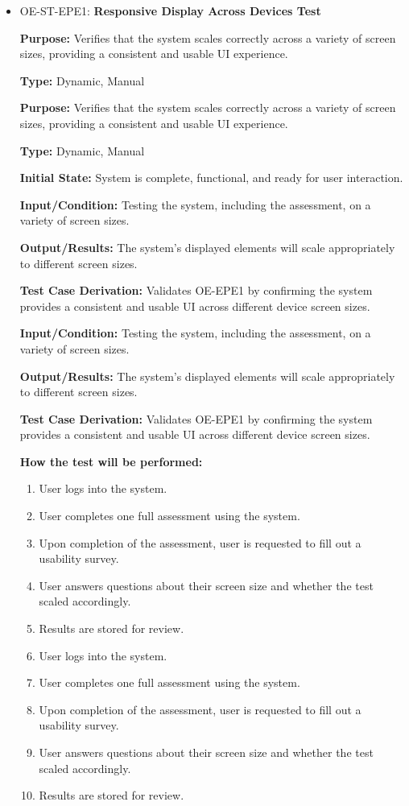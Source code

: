 \documentclass[12pt, titlepage]{article}
\begin{document}
\begin{itemize}
  \item OE-ST-EPE1: \textbf{Responsive Display Across Devices Test}
  \begin{mdframed}[linewidth=0.5mm]
      \textbf{Purpose:} Verifies that the system scales correctly across a variety of screen sizes, providing a consistent and usable UI experience. \par
      \textbf{Type:} Dynamic, Manual \par
      \textbf{Purpose:} Verifies that the system scales correctly across a variety of screen sizes, providing a consistent and usable UI experience. \par
      \textbf{Type:} Dynamic, Manual \par
      \textbf{Initial State:} System is complete, functional, and ready for user interaction. \par
      \textbf{Input/Condition:} Testing the system, including the assessment, on a variety of screen sizes. \par
      \textbf{Output/Results:} The system's displayed elements will scale appropriately to different screen sizes. \par
      \textbf{Test Case Derivation:} Validates OE-EPE1 by confirming the system provides a consistent and usable UI across different device screen sizes. \par
      \textbf{Input/Condition:} Testing the system, including the assessment, on a variety of screen sizes. \par
      \textbf{Output/Results:} The system's displayed elements will scale appropriately to different screen sizes. \par
      \textbf{Test Case Derivation:} Validates OE-EPE1 by confirming the system provides a consistent and usable UI across different device screen sizes. \par
      \textbf{How the test will be performed:}
      \begin{enumerate}[noitemsep]
        \item User logs into the system.
        \item User completes one full assessment using the system.
        \item Upon completion of the assessment, user is requested to fill out a usability survey.
        \item User answers questions about their screen size and whether the test scaled accordingly.
        \item Results are stored for review.
        \item User logs into the system.
        \item User completes one full assessment using the system.
        \item Upon completion of the assessment, user is requested to fill out a usability survey.
        \item User answers questions about their screen size and whether the test scaled accordingly.
        \item Results are stored for review.
      \end{enumerate}
  \end{mdframed}


\end{itemize}
\end{document}
